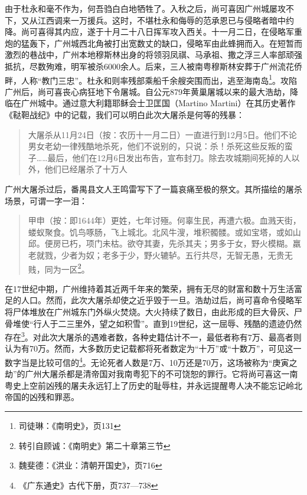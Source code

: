 由于杜永和毫不作为，何吾驺白白地牺牲了。入秋之后，尚可喜因广州城屡攻不下，又从江西调来一万援兵。这时，不堪杜永和侮辱的范承恩已与侵略者暗中约降。尚可喜得其内应，遂于十月二十八日挥军攻入西关。十一月二日，在侵略军重炮的猛轰下，广州城西北角被打出宽数丈的缺口，侵略军由此蜂拥而入。在短暂而激烈的巷战中，广州本地穆斯林出身的将领羽凤祺、马承祖、撒之浮三人率部顽强抵抗，尽数殉难，明军被杀6000余人。后来，三人被南粤穆斯林安葬于广州流花侨畔，人称“教门三忠”。杜永和则率残部乘船千余艘突围而出，逃至海南岛\footnote{司徒琳：《南明史》，页131}。攻陷广州后，尚可喜丧心病狂地下令屠城。自公元879年黄巢屠城以来的最大浩劫，降临在广州城中。通过意大利籍耶稣会士卫匡国（Martino Martini）在其历史著作《鞑靼战纪》中的记载，我们可以明白此次大屠杀是何等的残暴：

\begin{quote}

大屠杀从11月24日（按：农历十一月二日）一直进行到12月5日。他们不论男女老幼一律残酷地杀死，他们不说别的，只说：杀！杀死这些反叛的蛮子……最后，他们在12月6日发出布告，宣布封刀。除去攻城期间死掉的人以外，他们已经屠杀了十万人

\end{quote}

广州大屠杀过后，番禺县文人王鸣雷写下了一篇哀痛至极的祭文。其所描绘的屠杀场景，可谓一字一泪：

\begin{quote}
甲申（按：即1644年）更姓，七年讨殛。何辜生民，再遭六极。血溅天街，蝼蚁聚食。饥鸟啄肠，飞上城北。北风牛溲，堆积髑髅。或如宝塔，或如山邱。便房已朽，项门未枯。欲夺其妻，先杀其夫；男多于女，野火模糊。羸老就戮，少者为奴；老多于少，野火辘轳。五行共尽，无智无愚，无贵无贱，同为一区\footnote{转引自顾诚：《南明史》第二十章第三节}。

\end{quote}

在17世纪中期，广州维持着其近两千年来的繁荣，拥有无尽的财富和数十万生活富足的人口。然而，此次大屠杀却使之近乎毁于一旦。浩劫过后，尚可喜命令侵略军将尸体堆放在广州城东门外纵火焚烧。大火持续了数日，由此形成的巨大骨灰、尸骨堆使“行人于二三里外，望之如积雪”。直到19世纪，这一屈辱、残酷的遗迹仍然存在\footnote{魏斐德：《洪业：清朝开国史》，页716}。对此次大屠杀的遇难者数，各种史籍估计不一，最低者称有7万、最高者则认为有70万。然而，大多数历史记载都将死者数定为“十万”或“十数万”，可见这一数字当是比较可信的\footnote{《广东通史》古代下册，页737—738}。无论死者人数是7万、10万还是70万，这场被称为“庚寅之劫”的广州大屠杀都是清帝国对我南粤犯下的不可饶恕的罪行。它将尚可喜这一南粤史上空前凶残的屠夫永远钉上了历史的耻辱柱，并永远提醒粤人决不能忘记岭北帝国的凶残和罪恶。


